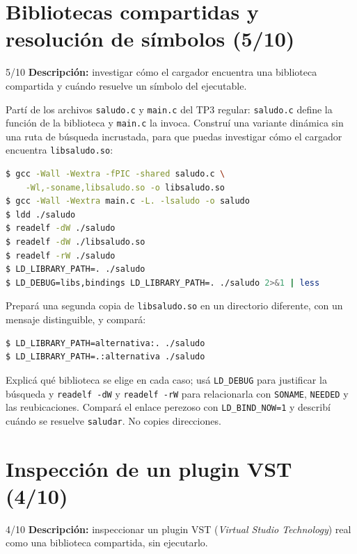 \documentclass[11pt,a4paper]{article}
\begin{document}
\newpage
\section{Bibliotecas compartidas y resolución de símbolos (5/10)}

\begin{trackbox}{5/10}
\textbf{Descripción:} investigar cómo el cargador encuentra una biblioteca
compartida y cuándo resuelve un símbolo del ejecutable.
\end{trackbox}

Partí de los archivos \texttt{saludo.c} y \texttt{main.c} del TP3 regular:
\texttt{saludo.c} define la función de la biblioteca y \texttt{main.c} la
invoca. Construí una variante dinámica sin una ruta de búsqueda incrustada,
para que puedas investigar cómo el cargador encuentra \texttt{libsaludo.so}:

\begin{lstlisting}[language=bash]
$ gcc -Wall -Wextra -fPIC -shared saludo.c \
    -Wl,-soname,libsaludo.so -o libsaludo.so
$ gcc -Wall -Wextra main.c -L. -lsaludo -o saludo
$ ldd ./saludo
$ readelf -dW ./saludo
$ readelf -dW ./libsaludo.so
$ readelf -rW ./saludo
$ LD_LIBRARY_PATH=. ./saludo
$ LD_DEBUG=libs,bindings LD_LIBRARY_PATH=. ./saludo 2>&1 | less
\end{lstlisting}

Prepará una segunda copia de \texttt{libsaludo.so} en un directorio diferente,
con un mensaje distinguible, y compará:

\begin{lstlisting}[language=bash]
$ LD_LIBRARY_PATH=alternativa:. ./saludo
$ LD_LIBRARY_PATH=.:alternativa ./saludo
\end{lstlisting}

Explicá qué biblioteca se elige en cada caso; usá \texttt{LD\_DEBUG} para
justificar la búsqueda y \texttt{readelf -dW} y \texttt{readelf -rW} para
relacionarla con \texttt{SONAME}, \texttt{NEEDED} y las reubicaciones. Compará
el enlace perezoso con \texttt{LD\_BIND\_NOW=1} y describí cuándo se resuelve
\texttt{saludar}. No copies direcciones.

\newpage
\section{Inspección de un plugin VST (4/10)}

\begin{trackbox}{4/10}
\textbf{Descripción:} inspeccionar un plugin VST (\emph{Virtual Studio
Technology}) real como una biblioteca compartida, sin ejecutarlo.
\end{trackbox}
\end{document}
